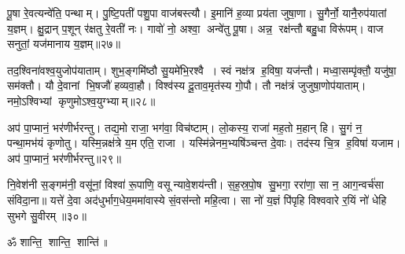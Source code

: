 पू॒षा रे॒वत्यन्वे॑ति॒ पन्थाम्। पु॒ष्टि॒पती॑ पशु॒पा वाज॑बस्त्यौ। इ॒मानि॑ ह॒व्या प्रय॑ता जुषा॒णा। सु॒गैर्नो॒ यानै॒रुप॑यातां य॒ज्ञम्। क्षु॒द्रान् प॒शून् र॑क्षतु रे॒वती॑ नः। गावो॑ नो॒ अश्वा॒ अन्वे॑तु पू॒षा। अन्न॒ रक्ष॑न्तौ बहु॒धा विरू॑पम्। वाज सनुतां॒ यज॑मानाय य॒ज्ञम्॥२७॥ 

तद॒श्विना॑वश्व॒युजोप॑याताम्। शुभ॒ङ्गमि॑ष्ठौ सु॒यमे॑भि॒रश्वै। स्वं नक्ष॑त्र ह॒विषा॒ यज॑न्तौ। मध्वा॒सम्पृ॑क्तौ॒ यजु॑षा॒ सम॑क्तौ। यौ दे॒वानां भि॒षजौ॑ हव्यवा॒हौ। विश्व॑स्य दू॒ताव॒मृत॑स्य गो॒पौ। तौ नक्ष॑त्रं जुजुषा॒णोप॑याताम्। नमो॒ऽश्विभ्यां कृणुमोऽश्व॒युग्भ्याम्॥२८॥ 

अप॑ पा॒प्मानं॒ भर॑णीर्भरन्तु। तद्य॒मो राजा॒ भग॑वा॒\an{} विच॑ष्टाम्। लो॒कस्य॒ राजा॑ मह॒तो म॒हान् हि। सु॒गं न॒ पन्था॒मभ॑यं कृणोतु। यस्मि॒न्नक्ष॑त्रे य॒म एति॒ राजा। यस्मि॑न्नेनम॒भ्यषि॑ञ्चन्त दे॒वाः। तद॑स्य चि॒त्र ह॒विषा॑ यजाम। अप॑ पा॒प्मानं॒ भर॑णीर्भरन्तु॥२९॥ 

नि॒वेश॑नी स॒ङ्गम॑नी॒ वसू॑नां॒ विश्वा॑ रू॒पाणि॒ वसून्यावे॒शय॑न्ती। स॒ह॒स्र॒पो॒ष सु॒भगा॒ ररा॑णा॒ सा न॒ आग॒न्वर्च॑सा संविदा॒ना॥ यत्ते॑ दे॒वा अद॑धुर्भाग॒धेय॒ममा॑वास्ये सं॒वस॑न्तो महि॒त्वा। सा नो॑ य॒ज्ञं पि॑पृहि विश्ववारे र॒यिं नो॑ धेहि सुभगे सु॒वीरम्॥३०॥ 

\centerline{ॐ शान्ति॒ शान्ति॒ शान्ति॑॥}